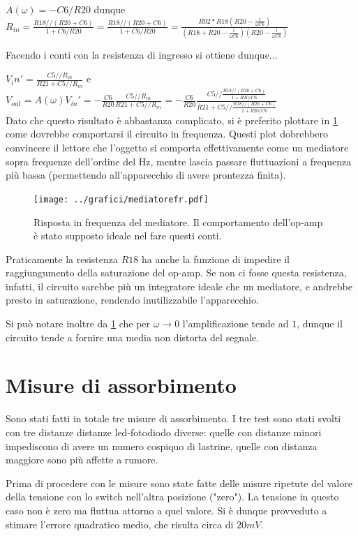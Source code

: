 \documentclass[a4paper,10pt]{article}
\begin{document}
$A(\omega)=-C6/R20$ dunque $R_{in}=\frac{R18//(R20+C6)}{1+C6/R20}=\frac{R18//(R20+C6)}{1+C6/R20}=\frac{R02*R18(R20-\frac{i}{\omega C6})}{(R18+R20-\frac{i}{\omega C6})(R20-\frac{i}{\omega C6})}$

Facendo i conti con la resistenza di ingresso si ottiene dunque...

$V_in'=\frac{C5//R_{in}}{R21+C5//R_{in}}$ e $V_{out}=A(\omega)V_{in}'=-\frac{C6}{R20}\frac{C5//R_{in}}{R21+C5//R_{in}}=-\frac{C6}{R20}\frac{C5//\frac{R18//(R20+C6)}{1+R20/C6}}{R21+C5//\frac{R18//(R20+C6)}{1+R20/C6}}$\\


Dato che questo risultato è abbastanza complicato, si è preferito plottare in \cref{fig:MEDFR} come dovrebbe comportarsi il circuito in frequenza. Questi plot dobrebbero convincere il lettore che l'oggetto si comporta effettivamente come un mediatore sopra frequenze dell'ordine del Hz, mentre lascia passare fluttuazioni a frequenza più bassa (permettendo all'apparecchio di avere prontezza finita).

\begin{figure}[H]
	\centering
	\texttt{[image: ../grafici/mediatorefr.pdf]}
	\caption{Risposta in frequenza del mediatore. Il comportamento dell'op-amp è stato supposto ideale nel fare questi conti.}
	\label{fig:MEDFR}
\end{figure}

Praticamente la resistenza $R18$ ha anche la funzione di impedire il raggiungumento della saturazione del op-amp. Se non ci fosse questa resistenza, infatti, il circuito sarebbe più un integratore ideale che un mediatore, e andrebbe presto in saturazione, rendendo inutilizzabile l'apparecchio.


Si può notare inoltre da \cref{fig:MEDFR} che per $\omega \rightarrow 0$ l'amplificazione tende ad $1$, dunque il circuito tende a fornire una media non distorta del segnale.



\section{Misure di assorbimento}


Sono stati fatti in totale tre misure di assorbimento. I tre test sono stati svolti con tre distanze distanze led-fotodiodo diverse: quelle con distanze minori impediscono di avere un numero cospiquo di lastrine, quelle con distanza maggiore sono più affette a rumore. 


Prima di procedere con le misure sono state fatte delle misure ripetute del valore della tensione con lo switch nell'altra posizione ("zero"). La tensione in questo caso non è zero ma fluttua attorno a quel valore. Si è dunque provveduto a stimare l'errore quadratico medio, che risulta circa di $20 mV$.
\end{document}
